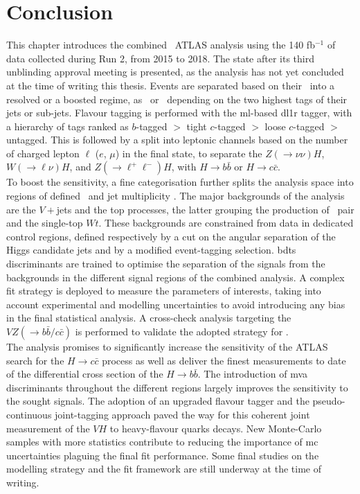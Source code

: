 \section{Conclusion}
This chapter introduces the combined \vhbc\ ATLAS analysis using the 140 fb$^{-1}$ of data collected during Run 2, from 2015 to 2018. The state after its third unblinding approval meeting is presented, as the analysis has not yet concluded at the time of writing this thesis. Events are separated based on their \ptv\ into a resolved or a boosted regime, as \vhb\ or \vhc\ depending on the two highest tags of their jets or sub-jets. Flavour tagging is performed with the \gls{ml}-based \gls{dl1r} tagger, with a hierarchy of tags ranked as $b$-tagged $>$ tight $c$-tagged $>$ loose $c$-tagged $>$ untagged. This is followed by a split into leptonic channels based on the number of charged lepton $\ell$ ($e$, $\mu$) in the final state, to separate the $Z(\rightarrow \nu\nu)H$, $W(\rightarrow \ell\nu)H$, and $Z(\rightarrow \ell^+\ell^-)H$, with $H \rightarrow b\bar{b}$ or $H \rightarrow c\bar{c}$. \\

To boost the sensitivity, a fine categorisation further splits the analysis space into regions of defined \ptv\ and jet multiplicity \nj. The major backgrounds of the analysis are the $V+$jets and the top processes, the latter grouping the production of \ttb\ pair and the single-top $Wt$. These backgrounds are constrained from data in dedicated control regions, defined respectively by a cut on the angular separation of the Higgs candidate jets and by a modified event-tagging selection. \glspl{bdt} discriminants are trained to optimise the separation of the signals from the backgrounds in the different signal regions of the combined analysis. A complex fit strategy is deployed to measure the parameters of interests, taking into account experimental and modelling uncertainties to avoid introducing any bias in the final statistical analysis. A cross-check analysis targeting the $VZ (\rightarrow b\bar{b}/c\bar{c})$ is performed to validate the adopted strategy for \vhbc. \\

The analysis promises to significantly increase the sensitivity of the ATLAS search for the $H\rightarrow c\bar{c}$ process as well as deliver the finest measurements to date of the differential cross section of the $H\rightarrow b\bar{b}$. The introduction of \gls{mva} discriminants throughout the different regions largely improves the sensitivity to the sought signals. The adoption of an upgraded flavour tagger and the pseudo-continuous joint-tagging approach paved the way for this coherent joint measurement of the $VH$ to heavy-flavour quarks decays. New Monte-Carlo samples with more statistics contribute to reducing the importance of \gls{mc} uncertainties plaguing the final fit performance. Some final studies on the modelling strategy and the fit framework are still underway at the time of writing. \\ %

